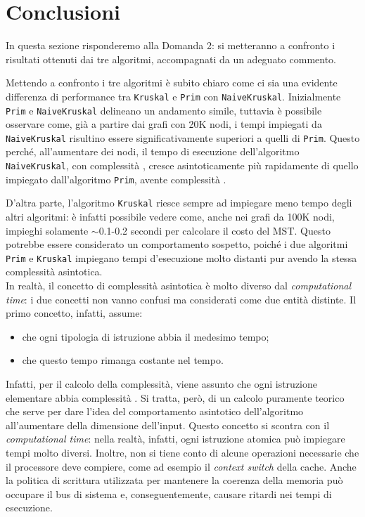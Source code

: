 \section{Conclusioni} \label{conc}
In questa sezione risponderemo alla Domanda 2: si metteranno a confronto i risultati ottenuti dai tre algoritmi, accompagnati da un adeguato commento.\acapo

Mettendo a confronto i tre algoritmi è subito chiaro come ci sia una evidente differenza di performance tra \texttt{Kruskal} e \texttt{Prim} con \texttt{NaiveKruskal}.
Inizialmente \texttt{Prim} e \texttt{NaiveKruskal} delineano un andamento simile, tuttavia è possibile osservare come, già a partire dai grafi con 20K nodi, i tempi impiegati da \texttt{NaiveKruskal} risultino essere significativamente superiori a quelli di \texttt{Prim}. Questo perché, all'aumentare dei nodi, il tempo di esecuzione dell'algoritmo \texttt{NaiveKruskal}, con complessità , cresce asintoticamente più rapidamente di quello impiegato dall'algoritmo \texttt{Prim}, avente complessità .\eqcapo

D'altra parte, l'algoritmo \texttt{Kruskal} riesce sempre ad impiegare meno tempo degli altri algoritmi: è infatti possibile vedere come, anche nei grafi da 100K nodi, impieghi solamente $\sim$0.1-0.2 secondi per calcolare il costo del MST. Questo potrebbe essere considerato un comportamento sospetto, poiché i due algoritmi \texttt{Prim} e \texttt{Kruskal} impiegano tempi d'esecuzione molto distanti pur avendo la stessa complessità asintotica. \\
In realtà, il concetto di complessità asintotica è molto diverso dal \emph{computational time}: i due concetti non vanno confusi ma considerati come due entità distinte. Il primo concetto, infatti, assume:
\begin{itemize}
	\item che ogni tipologia di istruzione abbia il medesimo tempo;
	\item che questo tempo rimanga costante nel tempo.
\end{itemize} 
Infatti, per il calcolo della complessità, viene assunto che ogni istruzione elementare abbia complessità . Si tratta, però, di un calcolo puramente teorico che serve per dare l'idea del comportamento asintotico dell'algoritmo all'aumentare della dimensione dell'input.\eqcapo
Questo concetto si scontra con il \emph{computational time}: nella realtà, infatti, ogni istruzione atomica può impiegare tempi molto diversi. Inoltre, non si tiene conto di alcune operazioni necessarie che il processore deve compiere, come ad esempio il \emph{context switch} della cache. Anche la politica di scrittura utilizzata per mantenere la coerenza della memoria può occupare il bus di sistema e, conseguentemente, causare ritardi nei tempi di esecuzione.\acapo

